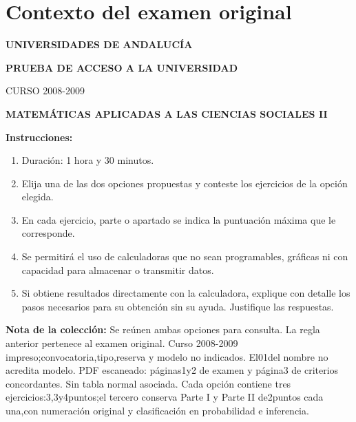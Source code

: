 \section*{Contexto del examen original}
\textbf{UNIVERSIDADES DE ANDALUCÍA}\par
\textbf{PRUEBA DE ACCESO A LA UNIVERSIDAD}\par
CURSO 2008-2009\par
\textbf{MATEMÁTICAS APLICADAS A LAS CIENCIAS SOCIALES II}

\textbf{Instrucciones:}
\begin{enumerate}[label=\textbf{\alph*)}]
  \item Duración: 1 hora y 30 minutos.
  \item Elija una de las dos opciones propuestas y conteste los ejercicios de la opción elegida.
  \item En cada ejercicio, parte o apartado se indica la puntuación máxima que le corresponde.
  \item Se permitirá el uso de calculadoras que no sean programables, gráficas ni con capacidad para almacenar o transmitir datos.
  \item Si obtiene resultados directamente con la calculadora, explique con detalle los pasos necesarios para su obtención sin su ayuda. Justifique las respuestas.
\end{enumerate}
\noindent\textbf{Nota de la colección:} Se reúnen ambas opciones para consulta. La regla anterior pertenece al examen original. Curso 2008-2009 impreso;convocatoria,tipo,reserva y modelo no indicados. El01del nombre no acredita modelo. PDF escaneado: páginas1y2 de examen y página3 de criterios concordantes. Sin tabla normal asociada. Cada opción contiene tres ejercicios:3,3y4puntos;el tercero conserva Parte I y Parte II de2puntos cada una,con numeración original y clasificación en probabilidad e inferencia.
\par\medskip
